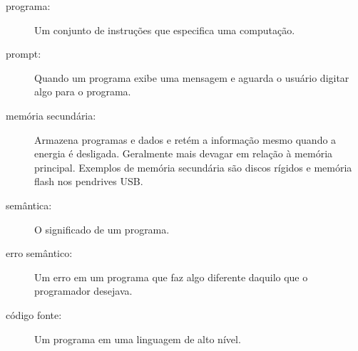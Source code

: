 \begin{description}
\item[programa:] Um conjunto de instruções que especifica uma computação.
%

\item[prompt:] Quando um programa exibe uma mensagem e aguarda o usuário
digitar algo para o programa.
%

\item[memória secundária:] Armazena programas e dados e retém a informação
mesmo quando a energia é desligada.  Geralmente mais devagar
em relação à memória principal. Exemplos de memória secundária são
discos rígidos e memória flash nos pendrives USB.
%

\item[semântica:]  O significado de um programa.
%

\item[erro semântico:] Um erro em um programa que faz algo diferente
daquilo que o programador desejava.
%

\item[código fonte:] Um programa em uma linguagem de alto nível.
%

\end{description}
%

